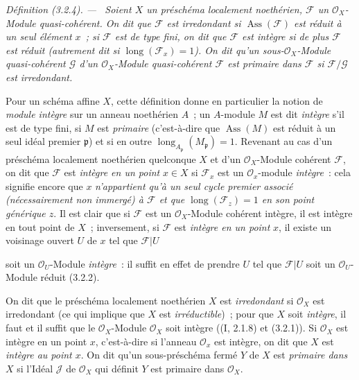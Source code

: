 \documentclass[10pt,oneside]{book}
\newcommand{\oldpage}[2][]{%
  \setcounter{footnote}{0}%
  \marginpar{\scriptsize\textbf{#1}~|~#2}\ignorespaces}
\newenvironment{definition}[1][]{%
  \par\medskip\noindent\itshape Définition (#1). ---\ }{\par}
\begin{document}
\begin{definition}[3.2.4]
\label{IV.2.3.2.4-fr}
Soient $X$ un préschéma localement noethérien, $\mathcal F$ un
$\mathcal O_X$-Module quasi-cohérent. On dit que $\mathcal F$ est
\emph{irredondant} si $\operatorname{Ass}(\mathcal F)$ est réduit à un seul
élément $x$~; si $\mathcal F$ est de type fini, on dit que $\mathcal F$ est
\emph{intègre} si de plus $\mathcal F$ est réduit (autrement dit si
$\operatorname{long}(\mathcal F_x)=1$). On dit qu'un sous-$\mathcal O_X$-Module
quasi-cohérent $\mathcal G$ d'un $\mathcal O_X$-Module quasi-cohérent
$\mathcal F$ est \emph{primaire dans $\mathcal F$} si
$\mathcal F/\mathcal G$ est irredondant.
\end{definition}

Pour un schéma affine $X$, cette définition donne en particulier la notion de
\emph{module intègre} sur un anneau noethérien $A$~; un $A$-module $M$ est dit
\emph{intègre} s'il est de type fini, si $M$ est \emph{primaire} (c'est-à-dire
que $\operatorname{Ass}(M)$ est réduit à un seul idéal premier
$\mathfrak p$) et si en outre
$\operatorname{long}_{A_\mathfrak p}(M_\mathfrak p)=1$. Revenant au cas d'un
préschéma localement noethérien quelconque $X$ et d'un
$\mathcal O_X$-Module cohérent $\mathcal F$, on dit que $\mathcal F$ est
\emph{intègre en un point} $x\in X$ si $\mathcal F_x$ est un
$\mathcal O_x$-module \emph{intègre}~: cela signifie encore que $x$
\emph{n'appartient qu'à un seul cycle premier associé (nécessairement non
immergé) à $\mathcal F$ et que $\operatorname{long}(\mathcal F_z)=1$ en son
point générique $z$}. Il est clair que si $\mathcal F$ est un
$\mathcal O_X$-Module cohérent intègre, il est intègre en tout point de $X$~;
inversement, si $\mathcal F$ est \emph{intègre en un point} $x$, il existe un
voisinage ouvert $U$ de $x$ tel que $\mathcal F|U$

\oldpage[IV-2]{42}
soit un $\mathcal O_U$-Module \emph{intègre}~: il suffit en effet de prendre
$U$ tel que $\mathcal F|U$ soit un $\mathcal O_U$-Module réduit (3.2.2).

On dit que le préschéma localement noethérien $X$ est \emph{irredondant} si
$\mathcal O_X$ est irredondant (ce qui implique que $X$ est
\emph{irréductible})~; pour que $X$ soit \emph{intègre}, il faut et il suffit
que le $\mathcal O_X$-Module $\mathcal O_X$ soit intègre ((I, 2.1.8) et
(3.2.1)). Si $\mathcal O_X$ est intègre en un point $x$, c'est-à-dire si
l'anneau $\mathcal O_x$ est intègre, on dit que $X$ est \emph{intègre au point
$x$}. On dit qu'un sous-préschéma fermé $Y$ de $X$ est \emph{primaire dans
$X$} si l'Idéal $\mathcal J$ de $\mathcal O_X$ qui définit $Y$ est primaire
dans $\mathcal O_X$.
\end{document}
